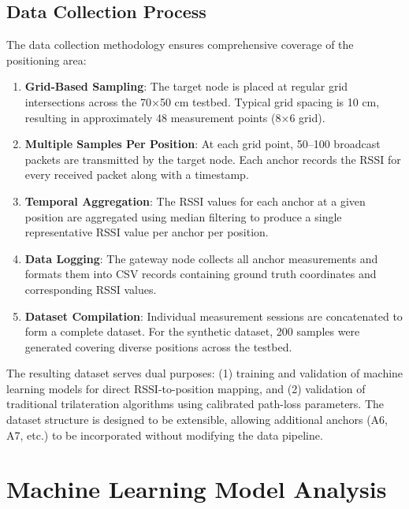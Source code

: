 \subsection{Data Collection Process}

The data collection methodology ensures comprehensive coverage of the positioning area:

\begin{enumerate}
    \item \textbf{Grid-Based Sampling}: The target node is placed at regular grid intersections across the 70×50 cm testbed. Typical grid spacing is 10 cm, resulting in approximately 48 measurement points (8×6 grid).
    
    \item \textbf{Multiple Samples Per Position}: At each grid point, 50--100 broadcast packets are transmitted by the target node. Each anchor records the RSSI for every received packet along with a timestamp.
    
    \item \textbf{Temporal Aggregation}: The RSSI values for each anchor at a given position are aggregated using median filtering to produce a single representative RSSI value per anchor per position.
    
    \item \textbf{Data Logging}: The gateway node collects all anchor measurements and formats them into CSV records containing ground truth coordinates and corresponding RSSI values.
    
    \item \textbf{Dataset Compilation}: Individual measurement sessions are concatenated to form a complete dataset. For the synthetic dataset, 200 samples were generated covering diverse positions across the testbed.
\end{enumerate}

The resulting dataset serves dual purposes: (1) training and validation of machine learning models for direct RSSI-to-position mapping, and (2) validation of traditional trilateration algorithms using calibrated path-loss parameters. The dataset structure is designed to be extensible, allowing additional anchors (A6, A7, etc.) to be incorporated without modifying the data pipeline.


\section{Machine Learning Model Analysis}
\label{sec:ml_model_analysis}

